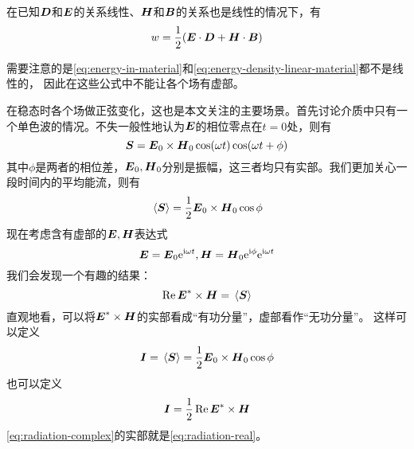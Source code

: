 在已知$\vb*{D}$和$\vb*{E}$的关系线性、$\vb*{H}$和$\vb*{B}$的关系也是线性的情况下，有
\begin{equation}
    w = \frac{1}{2} (\vb*{E} \cdot \vb*{D} + \vb*{H} \cdot \vb*{B})
    \label{eq:energy-density-linear-material}
\end{equation}

需要注意的是\eqref{eq:energy-in-material}和\eqref{eq:energy-density-linear-material}都不是线性的，
因此在这些公式中不能让各个场有虚部。

在稳态时各个场做正弦变化，这也是本文关注的主要场景。首先讨论介质中只有一个单色波的情况。不失一般性地认为$\vb*{E}$的相位零点在$t=0$处，则有
\[
    \vb*{S} = \vb*{E}_0 \times \vb*{H}_0 \cos(\omega t) \cos(\omega t + \phi)
\]
其中$\phi$是两者的相位差，$\vb*{E}_0, \vb*{H}_0$分别是振幅，这三者均只有实部。我们更加关心一段时间内的平均能流，则有
\[
    \expval*{\vb*{S}} = \frac{1}{2} \vb*{E}_0 \times \vb*{H}_0 \cos \phi
\]
现在考虑含有虚部的$\vb*{E}, \vb*{H}$表达式
\[
    \vb*{E} = \vb*{E}_0 \mathrm{e}^{\mathrm{i} \omega t}, \vb*{H} = \vb*{H}_0 \mathrm{e}^{\mathrm{i} \phi} \mathrm{e}^{\mathrm{i} \omega t}
\]
我们会发现一个有趣的结果：
\[
    \Re \vb*{E}^* \times \vb*{H} = \expval*{\vb*{S}}
\]
直观地看，可以将$\vb*{E}^* \times \vb*{H}$的实部看成“有功分量”，虚部看作“无功分量”。
这样可以定义
\begin{equation}
    \vb*{I} = \expval*{\vb*{S}} = \frac{1}{2} \vb*{E}_0 \times \vb*{H}_0 \cos \phi
    \label{eq:radiation-real}
\end{equation}
也可以定义
\begin{equation}
    \vb*{I} = \frac{1}{2} \Re \vb*{E}^* \times \vb*{H}
    \label{eq:radiation-complex}
\end{equation}
\eqref{eq:radiation-complex}的实部就是\eqref{eq:radiation-real}。

